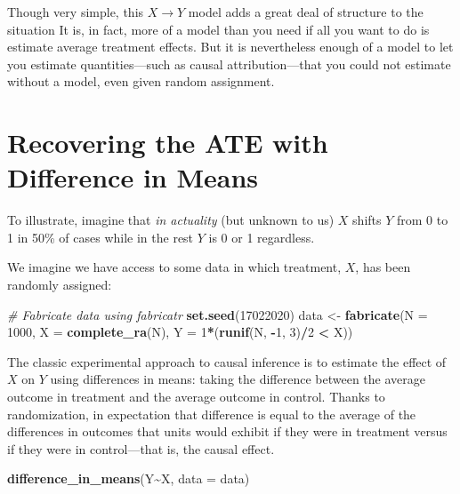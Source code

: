 \documentclass[
  12pt,
]{book}
\newenvironment{Shaded}{\begin{snugshade}}{\end{snugshade}}
\newcommand{\AttributeTok}[1]{\textcolor[rgb]{0.13,0.29,0.53}{#1}}
\newcommand{\CommentTok}[1]{\textcolor[rgb]{0.56,0.35,0.01}{\textit{#1}}}
\newcommand{\DecValTok}[1]{\textcolor[rgb]{0.00,0.00,0.81}{#1}}
\newcommand{\FunctionTok}[1]{\textcolor[rgb]{0.13,0.29,0.53}{\textbf{#1}}}
\newcommand{\NormalTok}[1]{#1}
\newcommand{\OtherTok}[1]{\textcolor[rgb]{0.56,0.35,0.01}{#1}}
\newcommand{\SpecialCharTok}[1]{\textcolor[rgb]{0.81,0.36,0.00}{\textbf{#1}}}
\begin{document}
Though very simple, this \(X \rightarrow Y\) model adds a great deal of structure to the situation It is, in fact, more of a model than you need if all you want to do is estimate average treatment effects. But it is nevertheless enough of a model to let you estimate quantities---such as causal attribution---that you could not estimate without a model, even given random assignment.

\hypertarget{recovering-the-ate-with-difference-in-means}{%
\section{Recovering the ATE with Difference in Means}\label{recovering-the-ate-with-difference-in-means}}

To illustrate, imagine that \emph{in actuality} (but unknown to us) \(X\) shifts \(Y\) from 0 to 1 in 50\% of cases while in the rest \(Y\) is 0 or 1 regardless.

We imagine we have access to some data in which treatment, \(X\), has been randomly assigned:

\begin{Shaded}
\begin{Highlighting}[]
\CommentTok{\# Fabricate data using fabricatr}
\FunctionTok{set.seed}\NormalTok{(}\DecValTok{17022020}\NormalTok{)}
\NormalTok{data  }\OtherTok{\textless{}{-}} \FunctionTok{fabricate}\NormalTok{(}\AttributeTok{N =} \DecValTok{1000}\NormalTok{, }\AttributeTok{X =} \FunctionTok{complete\_ra}\NormalTok{(N), }\AttributeTok{Y =} \DecValTok{1}\SpecialCharTok{*}\NormalTok{(}\FunctionTok{runif}\NormalTok{(N, }\SpecialCharTok{{-}}\DecValTok{1}\NormalTok{, }\DecValTok{3}\NormalTok{)}\SpecialCharTok{/}\DecValTok{2} \SpecialCharTok{\textless{}}\NormalTok{ X))}
\end{Highlighting}
\end{Shaded}

The classic experimental approach to causal inference is to estimate the effect of \(X\) on \(Y\) using differences in means: taking the difference between the average outcome in treatment and the average outcome in control. Thanks to randomization, in expectation that difference is equal to the average of the differences in outcomes that units would exhibit if they were in treatment versus if they were in control---that is, the causal effect.

\begin{Shaded}
\begin{Highlighting}[]
\FunctionTok{difference\_in\_means}\NormalTok{(Y}\SpecialCharTok{\textasciitilde{}}\NormalTok{X, }\AttributeTok{data =}\NormalTok{ data)}
\end{Highlighting}
\end{Shaded}
\end{document}
